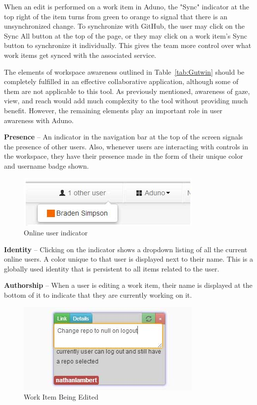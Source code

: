 \documentclass[conference]{IEEEtran}
\begin{document}
When an edit is performed on a work item in Aduno, the "Sync" indicator at the top right of the item turns from green to orange to signal that there is an unsynchronized change. To synchronize with GitHub, the user may click on the Sync All button at the top of the page, or they may click on a work item's Sync button to synchronize it individually. This gives the team more control over what work items get synced with the associated service.

The elements of workspace awareness outlined in Table~\ref{tab:Gutwin} should be completely fulfilled in an effective collaborative application, although some of them are not applicable to this tool. As previously mentioned, awareness of gaze, view, and reach would add much complexity to the tool without providing much benefit. However, the remaining elements play an important role in user awareness with Aduno.
  
{\bf Presence} – An indicator in the navigation bar at the top of the screen signals the presence of other users.  Also, whenever users are interacting with controls in the workspace, they have their presence made in the form of their unique color and username badge shown.

\begin{figure}[htb]
\centering
\includegraphics[scale=0.5]{aduno01}
\caption{Online user indicator}
\label{fig:otherusers}
\end{figure}

{\bf Identity} – Clicking on the indicator shows a dropdown listing of all the current online users. A color unique to that user is displayed next to their name.  This is a globally used identity that is persistent to all items related to the user. 

{\bf Authorship} – When a user is editing a work item, their name is displayed at the bottom of it to indicate that they are currently working on it.

\begin{figure}[htb]
\centering
\includegraphics[scale=0.5]{aduno02}
\caption{Work Item Being Edited}
\label{fig:workitem}
\end{figure}
\end{document}
